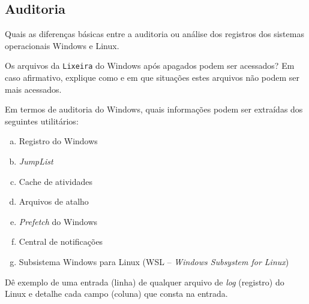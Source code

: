 \subsection*{Auditoria}

\exercise Quais as diferenças básicas entre a auditoria ou análise 
dos registros dos sistemas operacionais Windows e Linux.

\exercise Os arquivos da {\tt Lixeira} do Windows após 
apagados podem ser acessados? Em caso afirmativo, explique
como e em que situações estes arquivos não podem ser mais
acessados.

\exercise Em termos de auditoria do Windows, quais informações
podem ser extraídas dos seguintes utilitários:

\begin{enumerate}[a)]
\item Registro do Windows
\item {\it JumpList\/}
\item Cache de atividades
\item Arquivos de atalho
\item {\it Prefetch\/} do Windows
\item Central de notificações
\item Subsistema Windows para Linux (WSL -- {\it Windows Subsystem for Linux})
\end{enumerate}

\exercise Dê exemplo de uma entrada (linha) de qualquer arquivo de 
{\it log\/} (registro) do Linux e detalhe cada campo (coluna)
que consta na entrada.